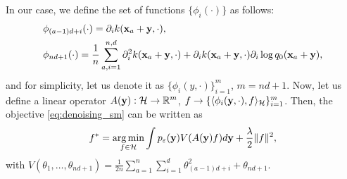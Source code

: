 In our case, we define the set of functions $\{\phi_i(\cdot)\}$ as follows:
\begin{align*}
    &\phi_{(a - 1)d + i}(\cdot) = \partial_i k({\bf x}_a + {\bf y}, \cdot),\\
    &\phi_{nd + 1}(\cdot) = \frac{1}{n}\sum\limits_{a, i = 1}^{n, d} \partial_i^2 k({\bf x}_a + {\bf y}, \cdot) + \partial_i k({\bf x}_a + {\bf y}, \cdot)\partial_i \log q_0({\bf x}_a + {\bf y}),
\end{align*}
and for simplicity, let us denote it as $\{\phi_i(y, \cdot)\}_{i = 1}^m$, $m = nd + 1$.
Now, let us define a linear operator
$A({\bf y}): \mathcal{H} \to \mathbb{R}^m$, $f \to \{\langle\phi_i({\bf y}, \cdot),
f\rangle_\mathcal{H}\}_{i = 1}^m$.
Then, the objective \eqref{eq:denoising_sm} can be written as
\begin{equation}
    \label{eq:denoising_objective_rkhs}
    f^* = \operatorname*{arg\,min}_{f \in \mathcal{H}} \int p_{\varepsilon}({\bf y})V(A({\bf y})f)d{\bf y}
    + \frac{\lambda}{2}\|f\|^2,
\end{equation}
with $V(\theta_1, \ldots, \theta_{nd + 1}) =
\frac{1}{2n}\sum\limits_{a = 1}^n\sum\limits_{i = 1}^d\theta^2_{(a - 1)d + i} +
\theta_{nd + 1}$.

